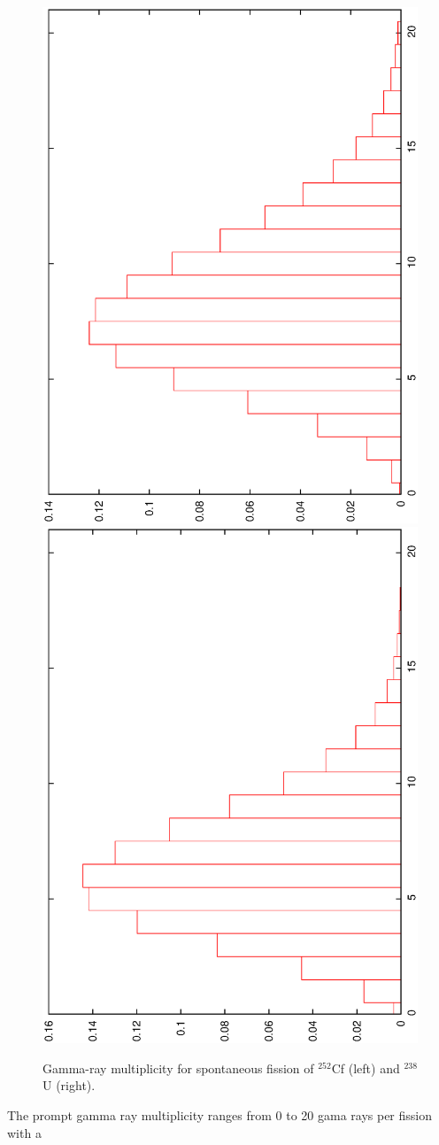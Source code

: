 \begin{figure}[ht]
\begin{center}
\includegraphics[scale=0.3, angle=-90]{eps/Cf252_nugdist.eps}\includegraphics[scale=0.3, angle=-90]{eps/U238_nugdist.eps}
\end{center}
\caption{Gamma-ray multiplicity for spontaneous fission of  $^{252}$Cf (left) and $^{238}$U (right).}
\label{fig:gamma multiplicity}
\end{figure}

The prompt gamma ray multiplicity ranges from 0 to 20 gama rays per
fission with a